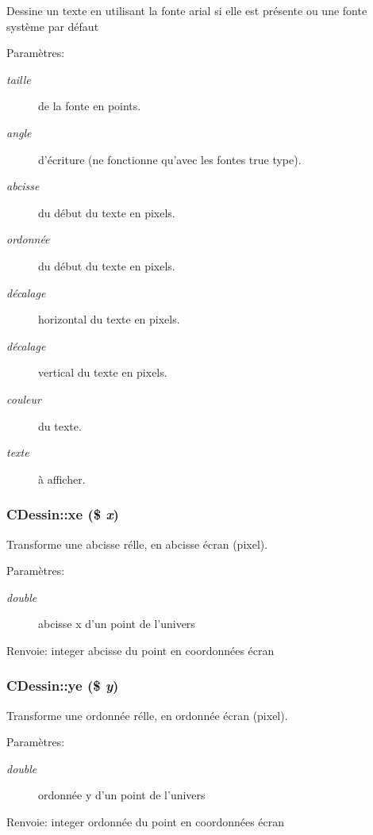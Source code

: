Dessine un texte en utilisant la fonte arial si elle est pr\'{e}sente ou une fonte syst\`{e}me par d\'{e}faut \begin{Desc}
\item[Param\`{e}tres:]
\begin{description}
\item[{\em taille}]de la fonte en points. \item[{\em angle}]d'\'{e}criture (ne fonctionne qu'avec les fontes true type). \item[{\em abcisse}]du d\'{e}but du texte en pixels. \item[{\em ordonn\'{e}e}]du d\'{e}but du texte en pixels. \item[{\em d\'{e}calage}]horizontal du texte en pixels. \item[{\em d\'{e}calage}]vertical du texte en pixels. \item[{\em couleur}]du texte. \item[{\em texte}]\`{a} afficher.\end{description}
\end{Desc}
\hypertarget{classCDessin_a5}{
\subsubsection[xe]{\setlength{\rightskip}{0pt plus 5cm}CDessin::xe (\$ {\em x})}}
\label{classCDessin_a5}


Transforme une abcisse r\'{e}lle, en abcisse \'{e}cran (pixel). \begin{Desc}
\item[Param\`{e}tres:]
\begin{description}
\item[{\em double}]abcisse x d'un point de l'univers \end{description}
\end{Desc}
\begin{Desc}
\item[Renvoie:]integer abcisse du point en coordonn\'{e}es \'{e}cran\end{Desc}
\hypertarget{classCDessin_a6}{
\subsubsection[ye]{\setlength{\rightskip}{0pt plus 5cm}CDessin::ye (\$ {\em y})}}
\label{classCDessin_a6}


Transforme une ordonn\'{e}e r\'{e}lle, en ordonn\'{e}e \'{e}cran (pixel). \begin{Desc}
\item[Param\`{e}tres:]
\begin{description}
\item[{\em double}]ordonn\'{e}e y d'un point de l'univers \end{description}
\end{Desc}
\begin{Desc}
\item[Renvoie:]integer ordonn\'{e}e du point en coordonn\'{e}es \'{e}cran\end{Desc}


